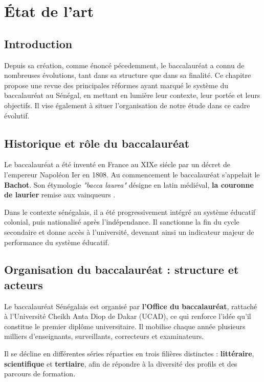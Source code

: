 \chapter{État de l’art}

\section{Introduction}

Depuis sa création, comme énoncé pécedemment, le baccalauréat a connu de nombreuses évolutions, tant dans sa structure que dans sa finalité.
Ce chapitre propose une revue des principales réformes ayant marqué le système du baccalauréat au Sénégal, en mettant en lumière leur contexte, leur portée et leurs objectifs.
Il vise également à situer l'organisation de notre étude dans ce cadre évolutif. 

\section{Historique et rôle du baccalauréat}

Le baccalauréat a été inventé en France au XIXe siécle par un décret de l'empereur Napoléon Ier en 1808.
Au commencement le baccalauréat s'appelait le \textbf{Bachot}.
Son étymologie \textit{ "bacca laurea"} désigne en latin médiéval, \textbf{la couronne de laurier} remise aux vainqueurs \cite{bacHistorique}.

Dans le contexte sénégalais, il a été progressivement intégré au système éducatif colonial, puis nationalisé après l’indépendance. 
Il sanctionne la fin du cycle secondaire et donne accès à l’université, devenant ainsi un indicateur majeur de performance du système éducatif.

\section{Organisation du baccalauréat : structure et acteurs}

Le baccalauréat Sénégalais est organisé par \textbf{l'Office du baccalauréat}, rattaché à l'Université Cheikh Anta Diop de Dakar (UCAD), ce qui renforce l'idée qu'il constitue le premier diplôme universitaire.
Il mobilise chaque année plusieurs milliers d’enseignants, surveillants, correcteurs et examinateurs.

Il se décline en différentes séries réparties en trois filières distinctes : \textbf{littéraire}, \textbf{scientifique} et \textbf{tertiaire}, afin de répondre à la diversité des profils et des parcours de formation. 

